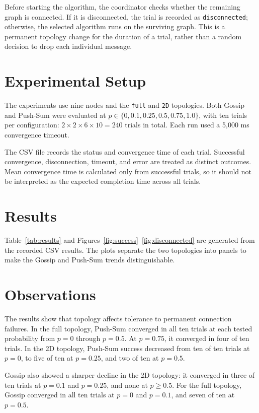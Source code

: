 \documentclass[11pt]{article}
\begin{document}
Before starting the algorithm, the coordinator checks whether the
remaining graph is connected. If it is disconnected, the trial is
recorded as \texttt{disconnected}; otherwise, the selected algorithm
runs on the surviving graph. This is a permanent topology change for
the duration of a trial, rather than a random decision to drop each
individual message.

\section{Experimental Setup}
The experiments use nine nodes and the \texttt{full} and \texttt{2D}
topologies. Both Gossip and Push-Sum were evaluated at
\(p\in\{0,0.1,0.25,0.5,0.75,1.0\}\), with ten trials per configuration:
\(2\times2\times6\times10=240\) trials in total. Each run used a
5,000 ms convergence timeout.

The CSV file records the status and convergence time of each trial.
Successful convergence, disconnection, timeout, and error are treated
as distinct outcomes. Mean convergence time is calculated only from
successful trials, so it should not be interpreted as the expected
completion time across all trials.

\section{Results}
Table~\ref{tab:results} and Figures~\ref{fig:success}--\ref{fig:disconnected}
are generated from the recorded CSV results. The plots separate the
two topologies into panels to make the Gossip and Push-Sum trends
distinguishable.



\section{Observations}
The results show that topology affects tolerance to permanent
connection failures. In the full topology, Push-Sum converged in all
ten trials at each tested probability from \(p=0\) through \(p=0.5\).
At \(p=0.75\), it converged in four of ten trials. In the 2D topology,
Push-Sum success decreased from ten of ten trials at \(p=0\), to five
of ten at \(p=0.25\), and two of ten at \(p=0.5\).

Gossip also showed a sharper decline in the 2D topology: it converged
in three of ten trials at \(p=0.1\) and \(p=0.25\), and none at
\(p\geq0.5\). For the full topology, Gossip converged in all ten
trials at \(p=0\) and \(p=0.1\), and seven of ten at \(p=0.5\).
\end{document}
